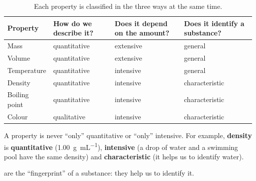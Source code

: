 \begin{table}[H]
    \centering
    \small
    \renewcommand{\arraystretch}{1.35}
    \begin{tabular}{p{2.4cm}p{3.2cm}p{3.4cm}p{3.4cm}}
        \toprule
        \textbf{Property} & \textbf{How do we describe it?} & \textbf{Does it depend on the amount?} & \textbf{Does it identify a substance?} \\
        \midrule
        Mass & quantitative & extensive & general \\
        Volume & quantitative & extensive & general \\
        Temperature & quantitative & intensive & general \\
        Density & quantitative & intensive & characteristic \\
        Boiling point & quantitative & intensive & characteristic \\
        Colour & qualitative & intensive & characteristic \\
        \bottomrule
    \end{tabular}
    \caption{Each property is classified in the three ways at the same time.}
    \label{tab:u1_three_classifications}
\end{table}

\begin{impt}
    A property is never ``only'' quantitative or ``only'' intensive. For example, \textbf{density} is \textbf{quantitative} (\qty{1.00}{\g\per\mL}), \textbf{intensive} (a drop of water and a swimming pool have the same density) and \textbf{characteristic} (it helps us to identify water).
\end{impt}

 are the ``fingerprint'' of a substance: they help us to identify it.

